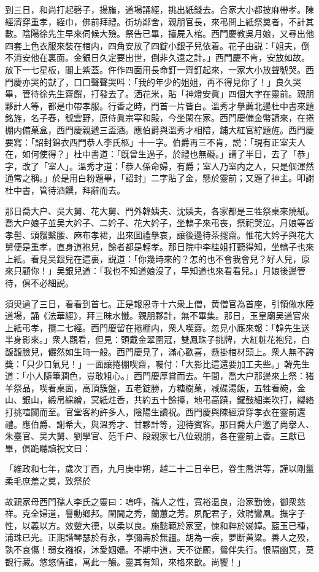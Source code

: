 到三日，和尚打起磬子，揚旛，道場誦經，挑出紙錢去。合家大小都披麻帶孝。陳經濟穿重孝，絰巾，佛前拜禮。街坊鄰舍，親朋官長，來弔問上紙祭奠者，不計其數。陰陽徐先生早來伺候大殮。祭告已畢，擡屍入棺。西門慶教吳月娘，又尋出他四套上色衣服來裝在棺内，四角安放了四錠小銀子兒依着。花子由説：「姐夫，倒不消安他在裏面。金銀日久定要出世，倒非久遠之計。」西門慶不肯，安放如故。放下一七星板，閣上紫蓋。仵作四面用長命釘一齊釘起來，一家大小放聲號哭。西門慶亦哭的獃了，口口聲聲哭呌：「我的年少的姐姐，再不得見你了！」良久哭畢，管待徐先生齋饌，打發去了。洒花米，貼「神燈安眞」四個大字在靈前。親朋夥計人等，都是巾帶孝服。行香之時，門首一片皆白。溫秀才擧薦北邊杜中書來題銘旌，名子春，號雲野，原侍眞宗寜和殿，今坐閑在家。西門慶備金幣請來，在捲棚内備菓盒，西門慶親遞三盃酒。應伯爵與溫秀才相陪，鋪大紅官紵題旌。西門慶要寫：「詔封錦衣西門恭人李氏柩」十一字。伯爵再三不肯，説：「現有正室夫人在，如何使得？」杜中書道：「旣曾生過子，於禮也無礙。」講了半日，去了「恭」字，改了「室人」。溫秀才道：「恭人係命婦，有爵；室人乃室内之人，只是個渾然通常之稱。」於是用白粉題畢，「詔封」二字貼了金，懸於靈前；又題了神主。叩謝杜中書，管待酒饌，拜辭而去。

那日喬大户、吳大舅、花大舅、門外韓姨夫、沈姨夫，各家都是三牲祭桌來燒紙。喬大户娘子並吴大妗子、二妗子、花大妗子，坐轎子來弔丧，祭祀哭泣。月娘等皆孝髻、頭鬚繫腰、麻布孝裙，出來囬禮擧哀，讓後邊待茶擺齋。惟花大妗子與花大舅便是重孝，直身道袍兒，餘者都是輕孝。那日院中李桂姐打聽得知，坐轎子也來上紙。看見吴銀兒在這裏，説道：「你幾時來的？怎的也不會我會兒？好人兒，原來只顧你！」吴銀兒道：「我也不知道娘沒了，早知道也來看看兒。」月娘後邊管待，俱不必細説。

須臾過了三日，看看到首七。正是報恩寺十六衆上僧，黄僧官為首座，引領做水陸道場，誦《法華經》，拜三昧水懺。親朋夥計，無不畢集。那日，玉皇廟吴道官來上紙弔孝，攬二七經。西門慶留在捲棚内，衆人喫齋。忽見小廝來報：「韓先生送半身影來。」衆人觀看，但見：頭戴金翠圍冠，雙鳳珠子挑牌，大紅粧花袍兒，白馥馥臉兒，儼然如生時一般。西門慶見了，滿心歡喜，懸掛棺材頭上。衆人無不誇獎：「只少口氣兒！」一面讓捲棚喫齋，囑付：「大影比這還要加工夫些。」韓先生道：「小人隨筆潤色，豈敢粗心。」西門慶厚賞而去。午間，喬大户那邊來上祭：猪羊祭品，喫看桌面，高頂簇盤，五老錠勝，方糖樹菓，减碟湯飯，五牲看碗，金山、銀山，緞帛綵繒，冥紙炷香，共約五十餘擡，地弔高蹺，鑼鼓細楽吹打，纓絡打挑喧闐而至。官堂客約許多人，陰陽生讀祝。西門慶與陳經濟穿孝衣在靈前還禮。應伯爵、謝希大，與溫秀才、甘夥計等，迎待賓客。那日喬大户邀了尚擧人、朱臺官、吴大舅、劉學官、范千户、段親家七八位親朋，各在靈前上香。三獻已畢，俱跪聽讀祝文曰：

\begin{myquote}
「維政和七年，歲次丁酉，九月庚申朔，越二十二日辛巳，眷生喬洪等，謹以剛鬣柔毛庶羞之奠，致祭於

故親家母西門孺人李氏之靈曰：嗚呼，孺人之性，寬裕温良，治家勤儉，御衆慈祥。克全婦道，譽動鄉邦。閨閫之秀，蘭蕙之芳。夙配君子，效聘鸞凰。撫字子性，以義以方。效顰大德，以柔以良。施懿範於家室，悚和粹於娣嫜。藍玉已種，浦珠已光。正期諧琴瑟於有永，享彌壽於無疆。胡為一疾，夢断黄粱。善人之殁，孰不哀傷！弱女襁褓，沐愛姻嬙。不期中道，天不従願，鴛伴失行。恨隔幽冥，莫覩行藏。悠悠情誼，寓此一觴。靈其有知，來格來歆。尚饗！」
\end{myquote}


